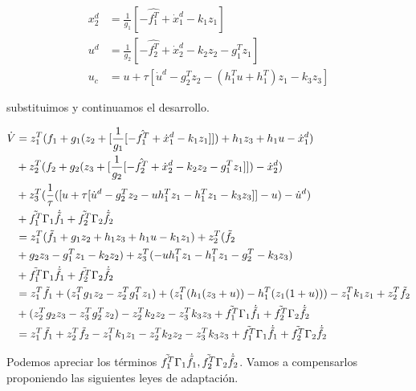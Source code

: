 \begin{align}
    x^d_2 &= \frac{1}{g_{1}} [- \hat{f_1^T} + \dot x^d_1 - k_1 z_1] \nonumber \\
    u^d &= \frac{1}{g_{2}} [- \hat{f_2^T} + \dot x_{2}^d - k_2 z_2 - g_{1}^T z_1] \nonumber \\
    u_c &= u + \tau [\dot u^d - g_{2}^T z_2 - (h_1^Tu + h_1^T)z_1 - k_3 z_3]
\end{align}

substituimos y continuamos el desarrollo.  

\begin{align}
      \dot V &=  z^T_1 (f_1 + g_{1} (z_2 + [\frac{1}{g_{1}} [- \hat{f_1^T}  + \dot x^d_1 - k_1 z_1]]) + h_1 z_3 + h_1 u - \dot x^d_1) \nonumber \\
      &+ z^T_2 (f_2 + g_{2} (z_3 + [\frac{1}{g_{2}} [- \hat{f_2^T} + \dot x_{2}^d - k_2 z_2 - g_{1}^T z_1]]) - \dot x^d_2) \nonumber \\
      &+ z^T_3 (\frac{1}{\tau}([ u + \tau [\dot u^d - g_{2}^T z_2 - u h_1^T z_1 - h_{1}^T z_1 - k_3 z_3]] - u) - \dot u^d) \nonumber \\
      &+ \Tilde{f_1^T}  \Gamma_1 \dot{\Tilde{f_1}} + \Tilde{f_2^T} \Gamma_2 \dot{\Tilde{f_2}} \nonumber \\
      &= z^T_1 (\Tilde{f_1} + g_1 z_2  + h_1 z_3 + h_1 u - k_1 z_1) + z^T_2 (\Tilde{f_2} \nonumber \\
      &+ g_2 z_3 - g^T_1 z_1 - k_2 z_2) + z^T_3 (- u h_1^T z_1 - h_1^T z_1  - g_{2}^T - k_3 z_3) \nonumber \\
      &+ \Tilde{f_1^T}  \Gamma_1 \dot{\Tilde{f_1}} + \Tilde{f_2^T} \Gamma_2 \dot{\Tilde{f_2}} \nonumber \\
      &= z^T_1 \Tilde{f_1} + (z^T_1g_1 z_2 - z^T_2 g^T_1 z_1 ) + (z_1^T(h_1 (z_3 + u)) - h_1^T(z_1(1+u))) - z^T_1 k_1 z_1 + z^T_2 \Tilde{f_2} \nonumber \\ 
      &+ (z^T_2 g_2 z_3 - z^T_3 g_{2}^T z_2 ) -  z^T_2 k_2 z_2 - z^T_3  k_3 z_3 + \Tilde{f_1^T}  \Gamma_1 \dot{\Tilde{f_1}} + \Tilde{f_2^T} \Gamma_2 \dot{\Tilde{f_2}} \nonumber \\
      &= z^T_1 \Tilde{f_1} + z^T_2 \Tilde{f_2} - z^T_1 k_1 z_1 - z^T_2 k_2 z_2 -  z^T_3  k_3 z_3  + \Tilde{f_1^T}  \Gamma_1 \dot{\Tilde{f_1}} + \Tilde{f_2^T} \Gamma_2 \dot{\Tilde{f_2}}
\end{align}

Podemos apreciar los términos $\Tilde{f_1^T}  \Gamma_1 \dot{\Tilde{f_1}} ,  \Tilde{f_2^T} \Gamma_2 \dot{\Tilde{f_2}}$.
Vamos a compensarlos proponiendo las siguientes leyes de adaptación. 

